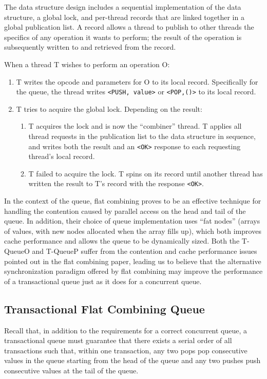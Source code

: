 The data structure design includes a sequential implementation of the data structure, a global lock, and per-thread records that are linked together in a global publication list. A record allows a thread to publish to other threads the specifics of any operation it wants to perform; the result of the operation is subsequently written to and retrieved from the record.

When a thread T wishes to perform an operation O:
\begin{enumerate}
    \item T writes the opcode and parameters for O to its local record. Specifically for the queue, the thread writes \texttt{<PUSH, value>} or \texttt{<POP,()>} to its local record.
   \item T tries to acquire the global lock. Depending on the result:
   \begin{enumerate}
        \item T acquires the lock and is now the “combiner” thread. T applies all thread requests in the publication list to the data structure in sequence, and writes both the result and an \texttt{<OK>} response to each requesting thread's local record.
        \item T failed to acquire the lock. T spins on its record until another thread has written the result to T's record with the response \texttt{<OK>}.
    \end{enumerate}
\end{enumerate}

In the context of the queue, flat combining proves to be an effective technique for handling the contention caused by parallel access on the head and tail of the queue. In addition, their choice of queue implementation uses ``fat nodes'' (arrays of values, with new nodes allocated when the array fills up), which both improves cache performance and allows the queue to be dynamically sized. Both the T-QueueO and T-QueueP suffer from the contention and cache performance issues pointed out in the flat combining paper, leading us to believe that the alternative synchronization paradigm offered by flat combining may improve the performance of a transactional queue just as it does for a concurrent queue.

\subsection{Transactional Flat Combining Queue} 
\label{fcqueuet}

Recall that, in addition to the requirements for a correct concurrent queue, a transactional queue must guarantee that there exists a serial order of all transactions such that, within one transaction, any two pops pop consecutive values in the queue starting from the head of the queue and any two pushes push consecutive values at the tail of the queue.

